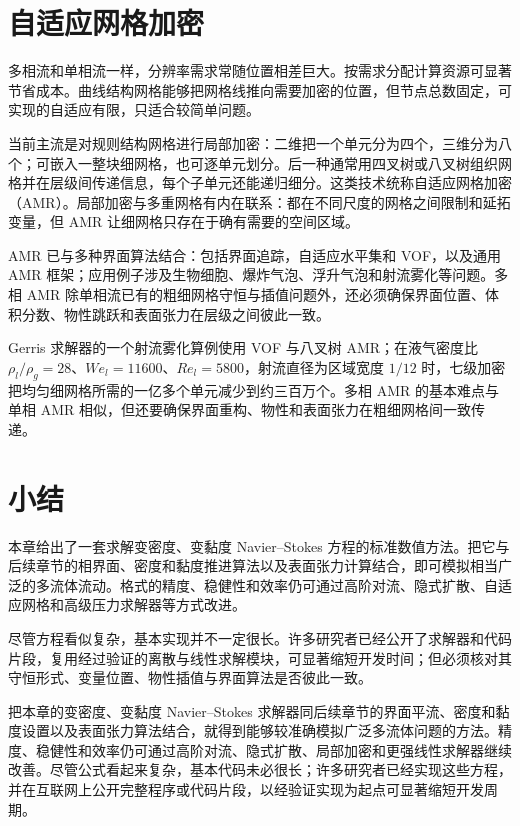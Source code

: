 \documentclass[11pt,a4paper,openany,fontset=none]{ctexbook}
\begin{document}
\section{自适应网格加密}

多相流和单相流一样，分辨率需求常随位置相差巨大。按需求分配计算资源可显著节省成本。曲线结构网格能够把网格线推向需要加密的位置，但节点总数固定，可实现的自适应有限，只适合较简单问题。

当前主流是对规则结构网格进行局部加密：二维把一个单元分为四个，三维分为八个；可嵌入一整块细网格，也可逐单元划分。后一种通常用四叉树或八叉树组织网格并在层级间传递信息，每个子单元还能递归细分。这类技术统称自适应网格加密（AMR）。局部加密与多重网格有内在联系：都在不同尺度的网格之间限制和延拓变量，但 AMR 让细网格只存在于确有需要的空间区域。

AMR 已与多种界面算法结合：包括界面追踪，自适应水平集和 VOF，以及通用 AMR 框架；应用例子涉及生物细胞、爆炸气泡、浮升气泡和射流雾化等问题。多相 AMR 除单相流已有的粗细网格守恒与插值问题外，还必须确保界面位置、体积分数、物性跳跃和表面张力在层级之间彼此一致。

Gerris 求解器的一个射流雾化算例使用 VOF 与八叉树 AMR；在液气密度比 $\rho_l/\rho_g=28$、$We_l=11600$、$Re_l=5800$，射流直径为区域宽度 $1/12$ 时，七级加密把均匀细网格所需的一亿多个单元减少到约三百万个。多相 AMR 的基本难点与单相 AMR 相似，但还要确保界面重构、物性和表面张力在粗细网格间一致传递。

\section{小结}

本章给出了一套求解变密度、变黏度 Navier--Stokes 方程的标准数值方法。把它与后续章节的相界面、密度和黏度推进算法以及表面张力计算结合，即可模拟相当广泛的多流体流动。格式的精度、稳健性和效率仍可通过高阶对流、隐式扩散、自适应网格和高级压力求解器等方式改进。

尽管方程看似复杂，基本实现并不一定很长。许多研究者已经公开了求解器和代码片段，复用经过验证的离散与线性求解模块，可显著缩短开发时间；但必须核对其守恒形式、变量位置、物性插值与界面算法是否彼此一致。

把本章的变密度、变黏度 Navier--Stokes 求解器同后续章节的界面平流、密度和黏度设置以及表面张力算法结合，就得到能够较准确模拟广泛多流体问题的方法。精度、稳健性和效率仍可通过高阶对流、隐式扩散、局部加密和更强线性求解器继续改善。尽管公式看起来复杂，基本代码未必很长；许多研究者已经实现这些方程，并在互联网上公开完整程序或代码片段，以经验证实现为起点可显著缩短开发周期。
\end{document}
